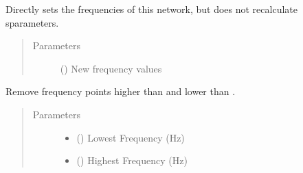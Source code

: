 \documentclass[letterpaper,10pt,english]{sphinxmanual}
\begin{document}
\begin{fulllineitems}

\begin{fulllineitems}
\label{\detokenize{touchstone:touchstone.spfile.set_frequencies_wo_recalc}}
Directly sets the frequencies of this network, but does not re\sphinxhyphen{}calculate s\sphinxhyphen{}parameters.
\begin{quote}\begin{description}
\item[{Parameters}] \leavevmode
{} () \textendash{} New frequency values

\end{description}\end{quote}

\end{fulllineitems}


\begin{fulllineitems}
\label{\detokenize{touchstone:touchstone.spfile.set_frequency_limits}}
Remove frequency points higher than  and lower than .
\begin{quote}\begin{description}
\item[{Parameters}] \leavevmode\begin{itemize}
\item {} 
 () \textendash{} Lowest Frequency (Hz)

\item {} 
 () \textendash{} Highest Frequency (Hz)


\end{itemize}
\end{description}
\end{quote}
\end{fulllineitems}
\end{fulllineitems}
\end{document}
